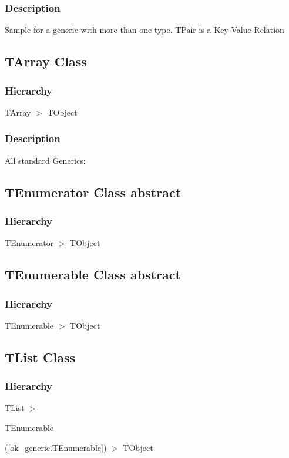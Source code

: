 \documentclass{report}
\begin{document}
\subsubsection*{\large{\textbf{Description}}\normalsize\hspace{1ex}\hfill}
Sample for a generic with more than one type. TPair is a Key{-}Value{-}Relation\subsection*{TArray Class}
\subsubsection*{\large{\textbf{Hierarchy}}\normalsize\hspace{1ex}\hfill}
TArray {$>$} TObject
\subsubsection*{\large{\textbf{Description}}\normalsize\hspace{1ex}\hfill}
All standard Generics:\subsection*{TEnumerator Class abstract}
\subsubsection*{\large{\textbf{Hierarchy}}\normalsize\hspace{1ex}\hfill}
TEnumerator {$>$} TObject
\subsection*{TEnumerable Class abstract}
\subsubsection*{\large{\textbf{Hierarchy}}\normalsize\hspace{1ex}\hfill}
TEnumerable {$>$} TObject
\subsection*{TList Class}
\subsubsection*{\large{\textbf{Hierarchy}}\normalsize\hspace{1ex}\hfill}
TList {$>$} \begin{ttfamily}TEnumerable\end{ttfamily}(\ref{ok_generic.TEnumerable}) {$>$} 
TObject
\end{document}
